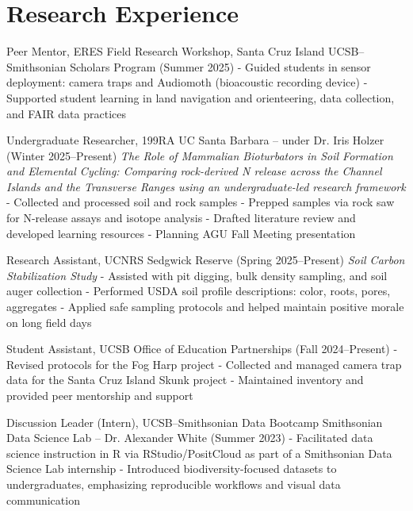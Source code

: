 \documentclass[letterpaper]{article}
\newenvironment{biblist}{%
   \begin{list}{}{%
     \setlength{\labelwidth}{0pt}%
     \setlength{\labelsep}{1em}%
     \setlength{\leftmargin}{2em}%
     \setlength{\itemindent}{-1em}%
   }
}{\end{list}}
\begin{document}
\section*{Research Experience}


\begin{biblist}
\item Peer Mentor, ERES Field Research Workshop, Santa Cruz Island  
UCSB–Smithsonian Scholars Program (Summer 2025)  
- Guided students in sensor deployment: camera traps and Audiomoth (bioacoustic recording device)  
- Supported student learning in land navigation and orienteering, data collection, and FAIR data practices

\item Undergraduate Researcher, 199RA  
UC Santa Barbara – under Dr. Iris Holzer (Winter 2025–Present)  
\emph{The Role of Mammalian Bioturbators in Soil Formation and Elemental Cycling: Comparing rock-derived N release across the Channel Islands and the Transverse Ranges using an undergraduate-led research framework}  
- Collected and processed soil and rock samples  
- Prepped samples via rock saw for N-release assays and isotope analysis  
- Drafted literature review and developed learning resources  
- Planning AGU Fall Meeting presentation

\item Research Assistant, UCNRS Sedgwick Reserve (Spring 2025–Present)  
\emph{Soil Carbon Stabilization Study}  
- Assisted with pit digging, bulk density sampling, and soil auger collection  
- Performed USDA soil profile descriptions: color, roots, pores, aggregates  
- Applied safe sampling protocols and helped maintain positive morale on long field days

\item Student Assistant, UCSB Office of Education Partnerships (Fall 2024–Present)  
- Revised protocols for the Fog Harp project  
- Collected and managed camera trap data for the Santa Cruz Island Skunk project  
- Maintained inventory and provided peer mentorship and support

\item Discussion Leader (Intern), UCSB–Smithsonian Data Bootcamp  
Smithsonian Data Science Lab – Dr. Alexander White (Summer 2023)  
- Facilitated data science instruction in R via RStudio/PositCloud as part of a Smithsonian Data Science Lab internship
- Introduced biodiversity-focused datasets to undergraduates, emphasizing reproducible workflows and visual data communication


\end{biblist}
\end{document}
